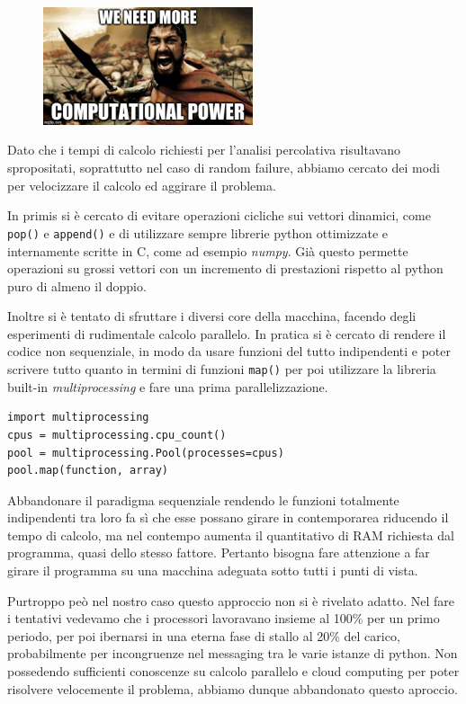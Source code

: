 \begin{figure}[ht!]
	\centering
	\includegraphics[width=0.55\textwidth]{./Immagini/Attack/meme_Leonida.jpg}
\end{figure}

Dato che i tempi di calcolo richiesti per l'analisi percolativa risultavano spropositati, soprattutto nel caso di random failure, abbiamo cercato dei modi per velocizzare il calcolo ed aggirare il problema.

In primis si è cercato di evitare operazioni cicliche sui vettori dinamici, come \lstinline{pop()} e \lstinline{append()} e di utilizzare sempre librerie python ottimizzate e internamente scritte in C, come ad esempio \emph{numpy}. Già questo permette operazioni su grossi vettori con un incremento di prestazioni rispetto al python puro di almeno il doppio.

Inoltre si è tentato di sfruttare i diversi core della macchina, facendo degli esperimenti di rudimentale calcolo parallelo. In pratica si è cercato di rendere il codice non sequenziale, in modo da usare funzioni del tutto indipendenti e poter scrivere tutto quanto in termini di funzioni \lstinline{map()} per poi utilizzare la libreria built-in \emph{multiprocessing} e fare una prima parallelizzazione. 

\begin{lstlisting}
import multiprocessing
cpus = multiprocessing.cpu_count()
pool = multiprocessing.Pool(processes=cpus)
pool.map(function, array)
\end{lstlisting}

Abbandonare il paradigma sequenziale rendendo le funzioni totalmente indipendenti tra loro fa sì che esse possano girare in contemporarea riducendo il tempo di calcolo, ma nel contempo aumenta il quantitativo di RAM richiesta dal programma, quasi dello stesso fattore. Pertanto bisogna fare attenzione a far girare il programma su una macchina adeguata sotto tutti i punti di vista.

Purtroppo peò nel nostro caso questo approccio non si è rivelato adatto. Nel fare i tentativi vedevamo che i processori lavoravano insieme al 100\% per un primo periodo, per poi ibernarsi in una eterna fase di stallo al 20\% del carico, probabilmente per incongruenze nel messaging tra le varie istanze di python. Non possedendo sufficienti conoscenze su calcolo parallelo e cloud computing per poter risolvere velocemente il problema, abbiamo dunque abbandonato questo aproccio.

